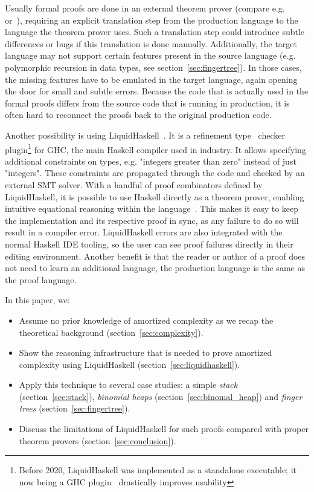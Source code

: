 \documentclass[sigplan,screen]{acmart}
\begin{document}
Usually formal proofs are done in an external theorem prover (compare e.g.~\cite{complexity_coq} or~\cite{complexity_isabelle}), requiring an explicit translation step from the production language to the language the theorem prover uses. Such a translation step could introduce subtle differences or bugs if this translation is done manually. Additionally, the target language may not support certain features present in the source language (e.g. polymorphic recursion in data types, see section~\ref{sec:fingertree}). In those cases, the missing features have to be emulated in the target language, again opening the door for small and subtle errors. Because the code that is actually used in the formal proofs differs from the source code that is running in production, it is often hard to reconnect the proofs back to the original production code.

Another possibility is using LiquidHaskell~\cite{liquidhaskell}. It is a refinement type~\cite{refinement_types} checker plugin\footnote{Before 2020, LiquidHaskell was implemented as a standalone executable; it now being a GHC plugin~\cite{lh_plugin} drastically improves usability} for GHC, the main Haskell compiler used in industry. It allows specifying additional constraints on types, e.g. "integers greater than zero" instead of just "integers". These constraints are propagated through the code and checked by an external SMT solver. With a handful of proof combinators defined by LiquidHaskell, it is possible to use Haskell directly as a theorem prover, enabling intuitive equational reasoning within the language~\cite{tpfa}. This makes it easy to keep the implementation and its respective proof in sync, as any failure to do so will result in a compiler error. LiquidHaskell errors are also integrated with the normal Haskell IDE tooling, so the user can see proof failures directly in their editing environment. Another benefit is that the reader or author of a proof does not need to learn an additional language, the production language is the same as the proof language.

In this paper, we:
\begin{itemize}
\item{Assume no prior knowledge of amortized complexity as we recap the theoretical background (section~\ref{sec:complexity}).}
\item{Show the reasoning infrastructure that is needed to prove amortized complexity using LiquidHaskell (section~\ref{sec:liquidhaskell}).}
\item{Apply this technique to several case studies: a simple \textit{stack} (section~\ref{sec:stack}), \textit{binomial heaps} (section~\ref{sec:binomal_heap}) and \textit{finger trees} (section~\ref{sec:fingertree}).}
\item{Discuss the limitations of LiquidHaskell for such proofs compared with proper theorem provers (section~\ref{sec:conclusion}).}
\end{itemize}
\end{document}
